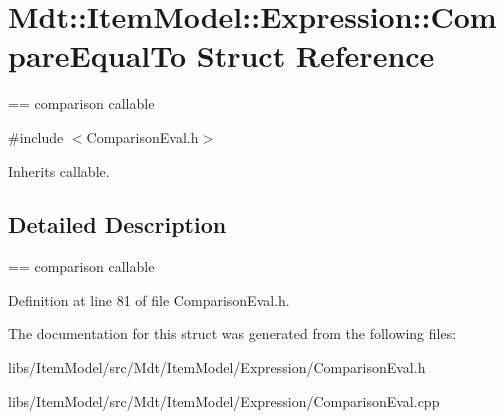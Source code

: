 \hypertarget{struct_mdt_1_1_item_model_1_1_expression_1_1_compare_equal_to}{}\section{Mdt\+:\+:Item\+Model\+:\+:Expression\+:\+:Compare\+Equal\+To Struct Reference}
\label{struct_mdt_1_1_item_model_1_1_expression_1_1_compare_equal_to}


== comparison callable  




{\ttfamily \#include $<$Comparison\+Eval.\+h$>$}



Inherits callable.



\subsection{Detailed Description}
== comparison callable 

Definition at line 81 of file Comparison\+Eval.\+h.



The documentation for this struct was generated from the following files\+:\begin{DoxyCompactItemize}
\item 
libs/\+Item\+Model/src/\+Mdt/\+Item\+Model/\+Expression/Comparison\+Eval.\+h\item 
libs/\+Item\+Model/src/\+Mdt/\+Item\+Model/\+Expression/Comparison\+Eval.\+cpp\end{DoxyCompactItemize}
